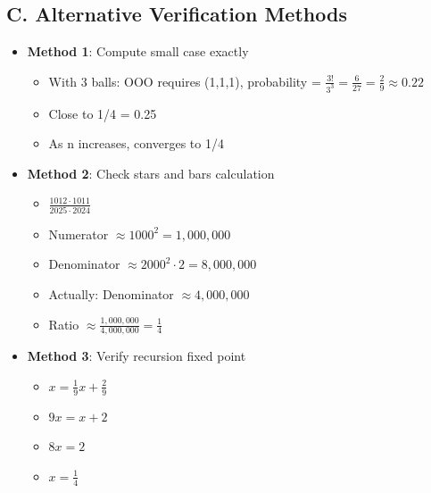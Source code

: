 \documentclass[12pt]{article}
\begin{document}
\begin{verificationbox}
\subsection*{C. Alternative Verification Methods}
\begin{itemize}[leftmargin=*]
    \item \textbf{Method 1}: Compute small case exactly
    \begin{itemize}
        \item With 3 balls: OOO requires (1,1,1), probability = $\frac{3!}{3^3} = \frac{6}{27} = \frac{2}{9} \approx 0.22$
        \item Close to 1/4 = 0.25 \checkmark
        \item As n increases, converges to 1/4
    \end{itemize}
    \item \textbf{Method 2}: Check stars and bars calculation
    \begin{itemize}
        \item $\frac{1012 \cdot 1011}{2025 \cdot 2024}$
        \item Numerator $\approx 1000^2 = 1,000,000$
        \item Denominator $\approx 2000^2 \cdot 2 = 8,000,000$
        \item Actually: Denominator $\approx 4,000,000$
        \item Ratio $\approx \frac{1,000,000}{4,000,000} = \frac{1}{4}$ \checkmark
    \end{itemize}
    \item \textbf{Method 3}: Verify recursion fixed point
    \begin{itemize}
        \item $x = \frac{1}{9}x + \frac{2}{9}$
        \item $9x = x + 2$
        \item $8x = 2$
        \item $x = \frac{1}{4}$ \checkmark
    \end{itemize}
\end{itemize}
\end{verificationbox}
\end{document}
